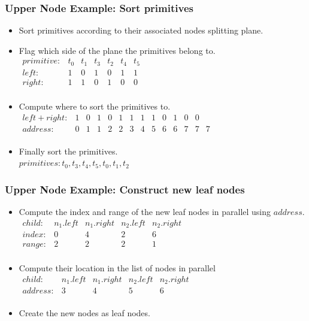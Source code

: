 \documentclass{beamer}
\begin{document}
\begin{frame}
  \frametitle{Upper Node Example: Sort primitives}
  
  \begin{itemize}
  \item Sort primitives according to their associated nodes splitting plane.
  \item Flag which side of the plane the primitives belong to.\\
    $\begin{array}{lcccccc}
      primitive: & t_0 & t_1 & t_3 & t_2 & t_4 & t_5 \\
      left:  & 1 & 0 & 1 & 0 & 1 & 1 \\
      right: & 1 & 1 & 0 & 1 & 0 & 0 \\
    \end{array}$
  \item Compute where to sort the primitives to.\\
    $\begin{array}{lccccccccccccc}
      left+right: & 1 & 0 & 1 & 0 & 1 & 1 & 1 & 1 & 0 & 1 & 0 & 0 \\
      address:    & 0 & 1 & 1 & 2 & 2 & 3 & 4 & 5 & 6 & 6 & 7 & 7 & 7 \\
    \end{array}$
  \item Finally sort the primitives.\\
    $primitives: t_0, t_3, t_4, t_5, t_0, t_1, t_2$
  \end{itemize}
\end{frame}

\begin{frame}
  \frametitle{Upper Node Example: Construct new leaf nodes}
  \begin{itemize}
    \item Compute the index and range of the new leaf nodes in parallel using
      $address$.\\
      $\begin{array}{lcccc}
        child: & n_1.left & n_1.right & n_2.left & n_2.right \\
        index: & 0 & 4 & 2 & 6 \\
        range: & 2 & 2 & 2 & 1 \\
      \end{array}$
    \item Compute their location in the list of nodes in parallel\\
      $\begin{array}{lcccc}
        child: & n_1.left & n_1.right & n_2.left & n_2.right \\
        address: & 3 & 4 & 5 & 6 \\
      \end{array}$
    \item Create the new nodes as leaf nodes.\\
  \end{itemize}
\end{frame}
\end{document}
